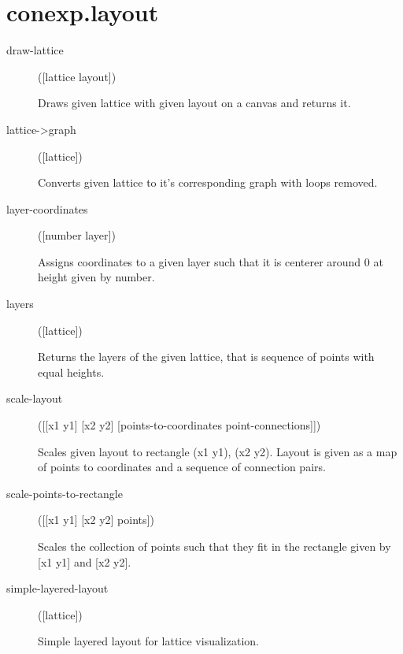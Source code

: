 \section{conexp.layout}
\begin{description}
  \item[draw-lattice]
([lattice layout])

Draws given lattice with given layout on a canvas and returns it.

  \item[lattice->graph]
([lattice])

Converts given lattice to it's corresponding graph with loops
  removed.

  \item[layer-coordinates]
([number layer])

Assigns coordinates to a given layer such that it is centerer
  around 0 at height given by number.

  \item[layers]
([lattice])

Returns the layers of the given lattice, that is sequence of points
  with equal heights.

  \item[scale-layout]
([[x1 y1] [x2 y2] [points-to-coordinates point-connections]])

Scales given layout to rectangle (x1 y1), (x2 y2). Layout is given
  as a map of points to coordinates and a sequence of connection pairs.

  \item[scale-points-to-rectangle]
([[x1 y1] [x2 y2] points])

Scales the collection of points such that they fit in the
  rectangle given by [x1 y1] and [x2 y2].

  \item[simple-layered-layout]
([lattice])

Simple layered layout for lattice visualization.

\end{description}

